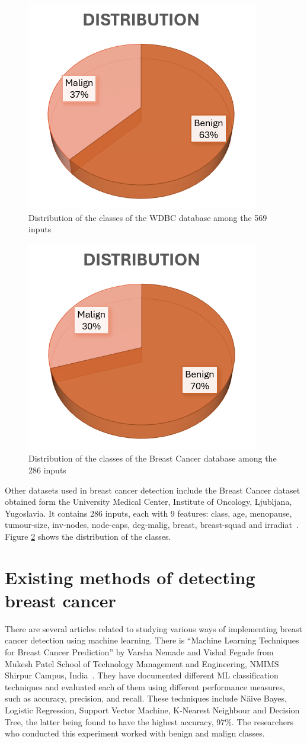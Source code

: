 \begin{figure}[ht!]
    \centering
    \includegraphics[width=0.5\linewidth]{figures/Figure34.png}
    \caption{Distribution of the classes of the WDBC database among the 569 inputs}
    \label{fig:fig28}
\end{figure}

\begin{figure}[H]
    \centering
    \includegraphics[width=0.5\linewidth]{figures/Figure35.png}
    \caption{Distribution of the classes of the Breast Cancer database among the 286 inputs}
    \label{fig:fig29}
\end{figure}

Other datasets used in breast cancer detection include the Breast Cancer dataset obtained form the University Medical Center, Institute of Oncology, Ljubljana, Yugoslavia. It contains 286 inputs, each with 9 features: class, age, menopause, tumour-size, inv-nodes, node-caps, deg-malig, breast, breast-squad and irradiat~\cite{link10}. Figure \ref{fig:fig29} shows the distribution of the classes.

\section{Existing methods of detecting breast cancer}

There are several articles related to studying various ways of implementing breast cancer detection using machine learning. There is “Machine Learning Techniques for Breast Cancer Prediction” by Varsha Nemade and Vishal Fegade from Mukesh Patel School of Technology Management and Engineering, NMIMS Shirpur Campus, India~\cite{carte2}. They have documented different ML classification techniques and evaluated each of them using different performance measures, such as accuracy, precision, and recall. These techniques include N{\"a}ive Bayes, Logistic Regression, Support Vector Machine, K-Nearest Neighbour and Decision Tree, the latter being found to have the highest accuracy, 97\%. The researchers who conducted this experiment worked with benign and malign classes. 

